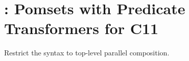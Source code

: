 \newpage
\section{\PwTcTITLE: Pomsets with Predicate Transformers for C11}

Restrict the syntax to top-level parallel composition.




    
